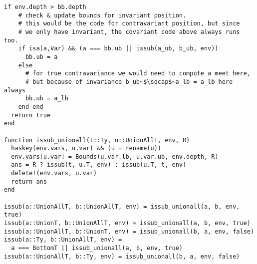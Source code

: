 \begin{singlespace}
\begin{lstlisting}[style=customjulia]
  if env.depth > bb.depth
    # check & update bounds for invariant position.
    # this would be the code for contravariant position, but since
    # we only have invariant, the covariant code above always runs too.
    if isa(a,Var) && (a === bb.ub || issub(a_ub, b_ub, env))
      bb.ub = a
    else
      # for true contravariance we would need to compute a meet here,
      # but because of invariance b_ub~$\sqcap$~a_lb = a_lb here always
      bb.ub = a_lb
    end end
  return true
end

function issub_unionall(t::Ty, u::UnionAllT, env, R)
  haskey(env.vars, u.var) && (u = rename(u))
  env.vars[u.var] = Bounds(u.var.lb, u.var.ub, env.depth, R)
  ans = R ? issub(t, u.T, env) : issub(u.T, t, env)
  delete!(env.vars, u.var)
  return ans
end

issub(a::UnionAllT, b::UnionAllT, env) = issub_unionall(a, b, env, true)
issub(a::UnionT, b::UnionAllT, env) = issub_unionall(a, b, env, true)
issub(a::UnionAllT, b::UnionT, env) = issub_unionall(b, a, env, false)
issub(a::Ty, b::UnionAllT, env) =
  a === BottomT || issub_unionall(a, b, env, true)
issub(a::UnionAllT, b::Ty, env) = issub_unionall(b, a, env, false)

\end{lstlisting}
\end{singlespace}

